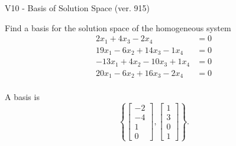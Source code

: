 \begin{exercise}
  \begin{exerciseTitle}V10 - Basis of Solution Space (ver. 915)\end{exerciseTitle}
  \begin{exerciseStatement}
    Find a basis for the solution space of the homogeneous system 
\begin{align*}
 2 x_ 1 + 4 x_ 3 -2 x_ 4 &= 0  \\ 
  19 x_ 1 -6 x_ 2 + 14 x_ 3 -1 x_ 4 &= 0  \\ 
  -13 x_ 1 + 4 x_ 2 -10 x_ 3 + 1 x_ 4 &= 0  \\ 
  20 x_ 1 -6 x_ 2 + 16 x_ 3 -2 x_ 4 &= 0  \\ 
 \end{align*}


 
  \end{exerciseStatement}

  \begin{exerciseAnswer}
   A basis is   
\[\left\{\left[\begin{array}{c}
-2 \\
-4 \\
1 \\
0
\end{array}\right] , \left[\begin{array}{c}
1 \\
3 \\
0 \\
1
\end{array}\right]\right\}.\]

  


  \end{exerciseAnswer}
\end{exercise}